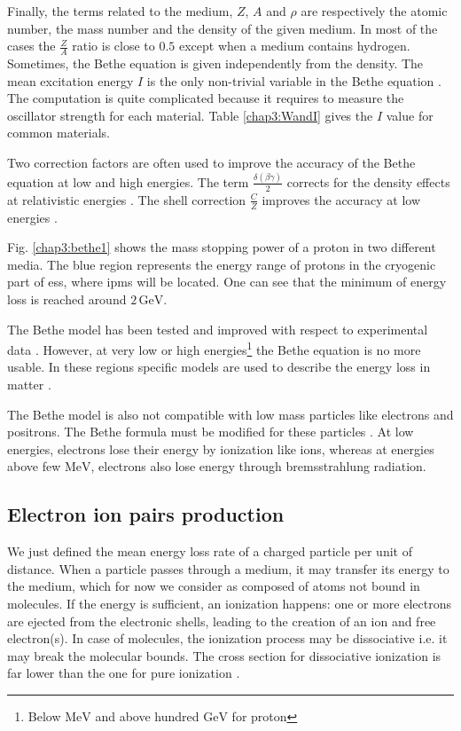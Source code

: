 \begin{refsection}
  Finally, the terms related to the medium, \(Z\), \(A\) and \(\rho\) are respectively the atomic number, the mass number and the density of the given medium. In most of the cases the \(\frac{Z}{A}\) ratio is close to \(0.5\) except when a medium contains hydrogen. Sometimes, the Bethe equation is given independently from the density.
  The mean excitation energy \(I\) is the only non-trivial variable in the Bethe equation \cite{Berger1984,Berger1993}. The computation is quite complicated because it requires to measure the oscillator strength for each material. Table \ref{chap3:WandI} gives the \(I\) value for common materials.

  Two correction factors are often used to improve the accuracy of the Bethe equation at low and high energies. The term \(\frac{\delta(\beta \gamma)}{2}\) corrects for the density effects at relativistic energies \cite{Sternheimer1984}. The shell correction \(\frac{C}{Z}\) improves the accuracy at low energies \cite{Bichsel2002}.

  

  Fig. \ref{chap3:bethe1} shows the mass stopping power of a proton in two different media. The blue region represents the energy range of protons in the cryogenic part of \acrshort{ess}, where \acrshort{ipm}s will be located. One can see that the minimum of energy loss is reached around \(2\,\mathrm{GeV}\).

  The Bethe model has been tested and improved with respect to experimental data \cite{Porter1990}. However, at very low or high energies\footnote{Below $\mathrm{MeV}$ and above hundred $\mathrm{GeV}$ for proton} the Bethe equation is no more usable. In these regions specific models are used to describe the energy loss in matter \cite{Ziegler1985, Allison1980}.

  The Bethe model is also not compatible with low mass particles like electrons and positrons. The Bethe formula must be modified for these particles \cite{Rieke1972}\cite[p. 452]{Tanabashi2018}. At low energies, electrons lose their energy by ionization like ions, whereas at energies above few \(\mathrm{MeV}\), electrons also lose energy through bremsstrahlung radiation.

  \subsection{Electron ion pairs production}
  We just defined the mean energy loss rate of a charged particle per unit of distance. When a particle passes through a medium, it may transfer its energy to the medium, which for now we consider as composed of atoms not bound in molecules. If the energy is sufficient, an ionization happens: one or more electrons are ejected from the electronic shells, leading to the creation of an ion and free electron(s). In case of molecules, the ionization process may be dissociative i.e. it may break the molecular bounds. The cross section for dissociative ionization is far lower than the one for pure ionization \cite{Dimopoulou2004}.


\end{refsection}
